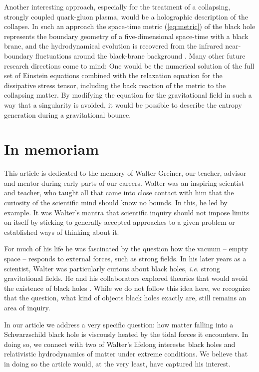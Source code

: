 \documentclass[article,twocolumn]{revtex4}
\begin{document}
Another interesting approach, especially for the treatment of a collapsing, strongly coupled quark-gluon plasma, would be a holographic description of the collapse. In such an approach the space-time metric (\ref{eq:metric}) of the black hole represents the boundary geometry of a five-dimensional space-time with a black brane, and the hydrodynamical evolution is recovered from the infrared near-boundary fluctuations around the black-brane background \cite{Kovtun:2003wp}. Many other future research directions come to mind: One would be the numerical solution of the full set of Einstein equations combined with the relaxation equation for the dissipative stress tensor, including the back reaction of the metric to the collapsing matter. By modifying the equation for the gravitational field in such a way that a singularity is avoided, it would be possible to describe the entropy generation during a gravitational bounce. 


\section*{In memoriam}

This article is dedicated to the memory of Walter Greiner, our teacher, advisor and mentor during early parts of our careers. Walter was an inspiring scientist and teacher, who taught all that came into close contact with him that the curiosity of the scientific mind should know no bounds. In this, he led by example. It was Walter's mantra that scientific inquiry should not impose limits on itself by sticking to generally accepted approaches to a given problem or established ways of thinking about it. 

For much of his life he was fascinated by the question how the vacuum -- empty space -- responds to external forces, such as strong fields. In his later years as a scientist, Walter was particularly curious about black holes, {\em i.e.} strong gravitational fields. He and his collaborators explored theories that would avoid the existence of black holes \cite{Hess:2010pba,Greiner:2014bjl}. While we do not follow this idea here, we recognize that the question, what kind of objects black holes exactly are, still remains an area of inquiry. 

In our article we address a very specific question: how matter falling into a Schwarzschild black hole is viscously heated by the tidal forces it encounters. In doing so, we connect with two of Walter's lifelong interests: black holes and relativistic hydrodynamics of matter under extreme conditions. We believe that in doing so the article would, at the very least, have captured his interest.
\end{document}
